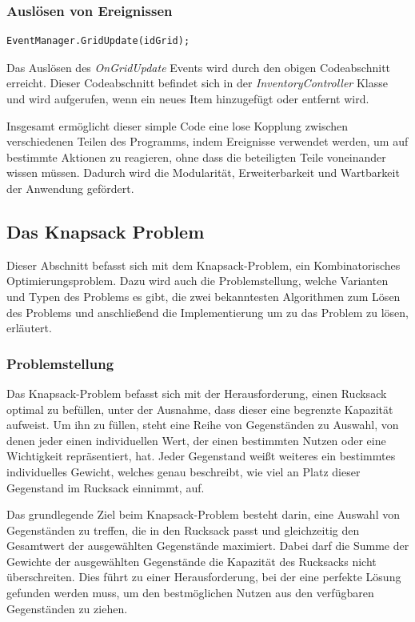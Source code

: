 \begin{itemize}
\subsubsection*{Auslösen von Ereignissen}

\begin{lstlisting}[style=csharp label=code:Event Trigger]
EventManager.GridUpdate(idGrid);
\end{lstlisting}

Das Auslösen des \textit{OnGridUpdate} Events wird durch den obigen Codeabschnitt erreicht. Dieser Codeabschnitt befindet
sich in der \textit{InventoryController} Klasse und wird aufgerufen, wenn ein neues Item hinzugefügt oder entfernt wird.


Insgesamt ermöglicht dieser simple Code eine lose Kopplung zwischen verschiedenen Teilen des Programms, indem Ereignisse verwendet
werden, um auf bestimmte Aktionen zu reagieren, ohne dass die beteiligten Teile voneinander wissen müssen. Dadurch wird die
Modularität, Erweiterbarkeit und Wartbarkeit der Anwendung gefördert.

\subsection{\label{sec:MoritzInventarBerechnen}Das Knapsack Problem} 
Dieser Abschnitt befasst sich mit dem Knapsack-Problem, ein Kombinatorisches Optimierungsproblem. Dazu wird auch die
Problemstellung, welche Varianten und Typen des Problems es gibt, die zwei bekanntesten Algorithmen zum Lösen des Problems
und anschließend die Implementierung um zu das Problem zu lösen, erläutert.

\subsubsection{Problemstellung}
Das Knapsack-Problem befasst sich mit der Herausforderung, einen Rucksack optimal zu befüllen, unter der Ausnahme, dass
dieser eine begrenzte Kapazität aufweist. Um ihn zu füllen, steht eine Reihe von Gegenständen zu Auswahl, von denen jeder
einen individuellen Wert, der einen bestimmten Nutzen oder eine Wichtigkeit repräsentiert, hat. Jeder Gegenstand weißt
weiteres ein bestimmtes individuelles Gewicht, welches genau beschreibt, wie viel an Platz dieser Gegenstand im Rucksack
einnimmt, auf.

Das grundlegende Ziel beim Knapsack-Problem besteht darin, eine Auswahl von Gegenständen zu treffen, die in den Rucksack
passt und gleichzeitig den Gesamtwert der ausgewählten Gegenstände maximiert. Dabei darf die Summe der Gewichte der
ausgewählten Gegenstände die Kapazität des Rucksacks nicht überschreiten. Dies führt zu einer Herausforderung, bei der
eine perfekte Lösung gefunden werden muss, um den bestmöglichen Nutzen aus den verfügbaren Gegenständen zu ziehen.


\end{itemize}
